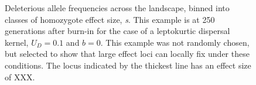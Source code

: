 \begin{figure}[h]%
\centering
{}
\caption[~- Deleterious allele frequencies across the landscape.]{Deleterious allele frequencies across the landscape, binned into classes of homozygote effect size, \emph{s}. This example is at 250 generations after burn-in for the case of a leptokurtic dispersal kernel, $U_D = 0.1$ and $b = 0$. This example was not randomly chosen, but selected to show that large effect loci can locally fix under these conditions. The locus indicated by the thickest line has an effect size of \color{red}XXX\color{black}.}
\label{fig:allfreqs}
\end{figure}





